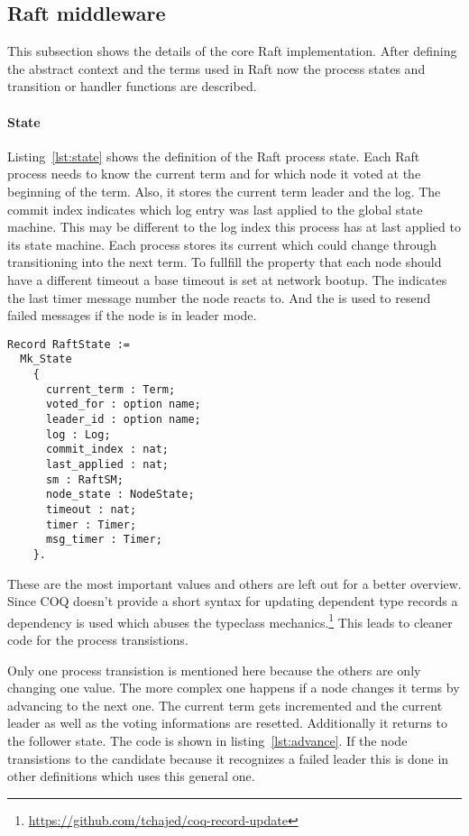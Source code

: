 \subsection{Raft middleware}
This subsection shows the details of the core Raft implementation.
After defining the abstract context and the terms used in Raft
now the process states and transition or handler functions are
described.

\paragraph{State}
Listing~\ref{lst:state} shows the definition of the Raft process
state. Each Raft process needs to know the current term and for
which node it voted at the beginning of the term. Also, it stores
the current term leader and the log. The commit index indicates which
log entry was last applied to the global state machine. This
may be different to the log index this process has at last applied
to its state machine. Each process stores its current 
which could change through transitioning into the next term.
To fullfill the property that each node should have a different
timeout a base timeout is set at network bootup.
The  indicates the last timer message number the node
reacts to. And the  is used to resend
failed messages if the node is in leader mode.

\begin{lstlisting}[style=coq,label=lst:state,
caption=The dependent record definition of the Raft process state.]
Record RaftState :=
  Mk_State
    {
      current_term : Term;
      voted_for : option name;
      leader_id : option name;
      log : Log;
      commit_index : nat;
      last_applied : nat;
      sm : RaftSM;
      node_state : NodeState;
      timeout : nat;
      timer : Timer;
      msg_timer : Timer;
    }. 
\end{lstlisting}

These are the most important values and others are left out
for a better overview. Since COQ doesn't provide a short
syntax for updating dependent type records a dependency is used
which abuses the typeclass
mechanics.\footnote{\url{https://github.com/tchajed/coq-record-update}}
This leads to cleaner code for the process transistions.

Only one process transistion is mentioned here because the others are
only changing one value.
The more complex one happens if a node changes it terms by advancing
to the next one. The current term gets incremented and the current
leader as well as the voting informations are resetted.
Additionally it returns to the follower state.
The code is shown in listing~\ref{lst:advance}.
If the node transistions to the candidate because it
recognizes a failed leader this is done in other definitions
which uses this general one.

